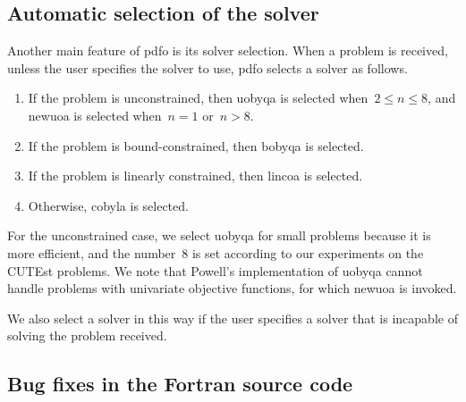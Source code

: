 \subsection{Automatic selection of the solver}
\label{subsec:solver-selection}

Another main feature of \gls{pdfo} is its solver selection.
When a problem is received, unless the user specifies the solver to use, \gls{pdfo} selects a solver as follows.
\begin{enumerate}
    \item If the problem is unconstrained, then \gls{uobyqa} is selected when~$2 \le n \le 8$, and \gls{newuoa} is selected when~$n = 1$ or~$n > 8$.
    \item If the problem is bound-constrained, then \gls{bobyqa} is selected.
    \item If the problem is linearly constrained, then \gls{lincoa} is selected.
    \item Otherwise, \gls{cobyla} is selected.
\end{enumerate}

For the unconstrained case, we select \gls{uobyqa} for small problems because it is more efficient, and the number~$8$ is set according to our experiments on the CUTEst problems.
We note that Powell's implementation of \gls{uobyqa} cannot handle problems with univariate objective functions, for which \gls{newuoa} is invoked.

We also select a solver in this way if the user specifies a solver that is incapable of solving the problem received.

\subsection{Bug fixes in the Fortran source code}
\label{subsec:bug-corrections}

